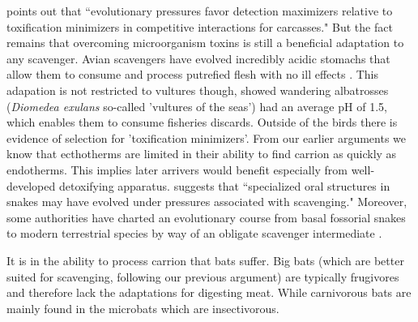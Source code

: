 \documentclass[a4paper,12pt]{article}
\begin{document}
\cite{shivik2006vultures} points out that ``evolutionary pressures favor detection maximizers relative to toxification minimizers in competitive interactions for carcasses." 
But the fact remains that overcoming microorganism toxins is still a beneficial adaptation to any scavenger. 
Avian scavengers have evolved incredibly acidic stomachs that allow them to consume and process putrefied flesh with no ill effects \citep{houston1975digestive,roggenbuck2014microbiome}. 
This adapation is not restricted to vultures though, \cite{gremillet2012vultures} showed wandering albatrosses (\textit{Diomedea exulans} so-called 'vultures of the seas') had an average pH of 1.5, which enables them to consume fisheries discards. 
Outside of the birds there is evidence of selection for 'toxification minimizers'.
From our earlier arguments we know that ecthotherms are limited in their ability to find carrion as quickly as endotherms. 
This implies later arrivers would benefit especially from well-developed detoxifying apparatus. 
\cite{shivik2006vultures} suggests that ``specialized oral structures in snakes may have evolved under pressures associated with scavenging."
Moreover, some authorities have charted an evolutionary course from basal fossorial snakes to modern terrestrial species by way of an obligate scavenger intermediate \citep{bauchot2006snakes}. 


It is in the ability to process carrion that bats suffer.
Big bats (which are better suited for scavenging, following our previous argument) are typically frugivores and therefore lack the adaptations for digesting  meat.
While carnivorous bats are mainly found in the microbats which are insectivorous.
\end{document}
